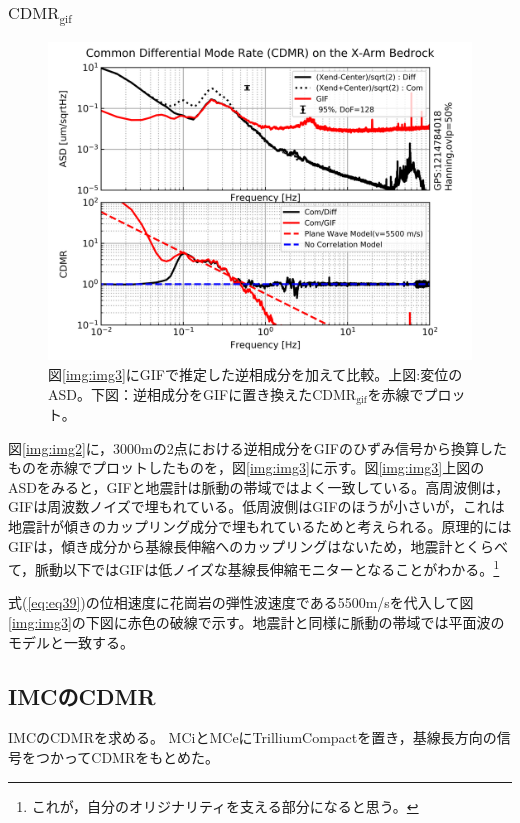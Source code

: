 \subsubsection{$\mathrm{CDMR_{gif}}$}
\begin{figure}[H]
  \begin{center}
    \includegraphics[width=11.5cm]{./cdmr/cmrr_xarm_gif.png}
  \end{center}
  \caption{図\ref{img:img3}にGIFで推定した逆相成分を加えて比較。上図:変位のASD。下図：逆相成分をGIFに置き換えた$\mathrm{CDMR_{gif}}$を赤線でプロット。
  }\label{img:img4}
\end{figure}


図\ref{img:img2}に，3000mの2点における逆相成分をGIFのひずみ信号から換算したものを赤線でプロットしたものを，図\ref{img:img3}に示す。図\ref{img:img3}上図のASDをみると，GIFと地震計は脈動の帯域ではよく一致している。高周波側は，GIFは周波数ノイズで埋もれている。低周波側はGIFのほうが小さいが，これは地震計が傾きのカップリング成分で埋もれているためと考えられる。原理的にはGIFは，傾き成分から基線長伸縮へのカップリングはないため，地震計とくらべて，脈動以下ではGIFは低ノイズな基線長伸縮モニターとなることがわかる。\footnote[11]{これが，自分のオリジナリティを支える部分になると思う。}

式(\ref{eq:eq39})の位相速度に花崗岩の弾性波速度である5500m/sを代入して図\ref{img:img3}の下図に赤色の破線で示す。地震計と同様に脈動の帯域では平面波のモデルと一致する。


\subsection{IMCのCDMR}
IMCのCDMRを求める。%
MCiとMCeにTrilliumCompactを置き，基線長方向の信号をつかってCDMRをもとめた。


